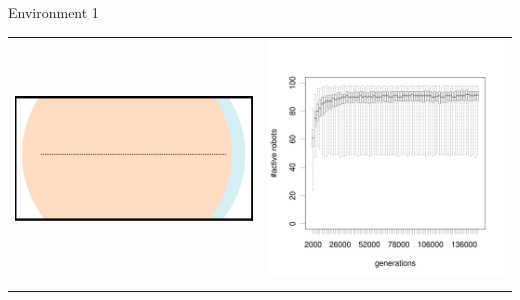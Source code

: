 \documentclass[8pt, handout=show,notes=show]{beamer}
\begin{document}
\begin{frame}{Environment 1}
\begin{table}[H]
\centering
\begin{tabular}{cc}
\includegraphics[width=\imgSize]{../images/5StaticEnv/environments/staticEnv1}&\includegraphics[width=\imgSize]{../images/5StaticEnv/alive_staticEnv1}\\
\newline

\end{tabular}
\end{table}
\end{frame}
\end{document}
